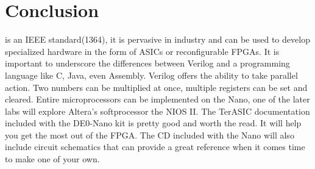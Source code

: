 \documentclass[12pt,journal]{IEEEtran}
\begin{document}
  \section{Conclusion}
     is an IEEE standard(1364)\cite{Wikipedia:Verilog}, it is pervasive in industry and can be used to develop specialized hardware in the form of ASICs or reconfigurable FPGAs. It is important to underscore the differences between Verilog and a programming language like C, Java, even Assembly. Verilog offers the ability to take parallel action. Two numbers can be multiplied at once, multiple registers can be set and cleared. Entire microprocessors can be implemented on the Nano, one of the later labs will explore Altera's softprocessor the NIOS II. The TerASIC documentation included with the DE0-Nano kit is pretty good and worth the read. It will help you get the most out of the FPGA. The CD included with the Nano will also include circuit schematics that can provide a great reference when it comes time to make one of your own.

  
  
\end{document}
